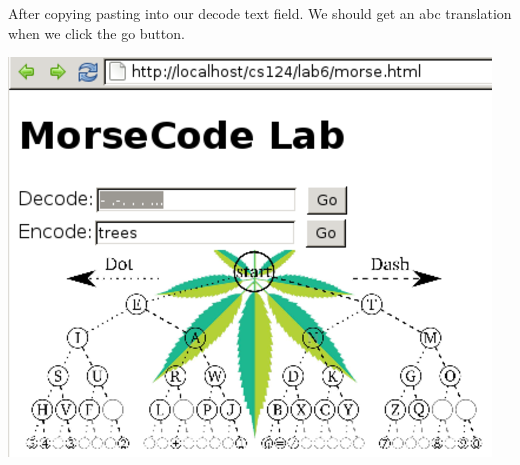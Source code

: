 After copying pasting into our decode text field. We should get an abc translation when we click the go button.

 
    \includegraphics{../test41.png}
     